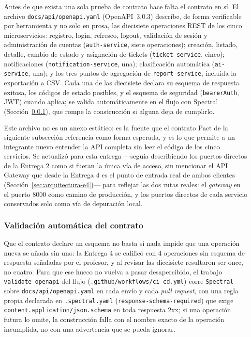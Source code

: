 Antes de que exista una sola prueba de contrato hace falta el contrato en sí. El archivo
\texttt{docs/api/openapi.yaml} (OpenAPI~3.0.3) describe, de forma verificable por herramienta y no
solo en prosa, las diecisiete operaciones REST de los cinco microservicios: registro, login,
refresco, logout, validación de sesión y administración de cuentas (\texttt{auth-service}, siete
operaciones); creación, listado, detalle, cambio de estado y asignación de tickets
(\texttt{ticket-service}, cinco); notificaciones (\texttt{notification-service}, una);
clasificación automática (\texttt{ai-service}, una); y los tres puntos de agregación de
\texttt{report-service}, incluida la exportación a CSV. Cada una de las diecisiete declara su
esquema de respuesta exitosa, los códigos de estado posibles, y el esquema de seguridad
(\texttt{bearerAuth}, JWT) cuando aplica; se valida automáticamente en el flujo con Spectral
(Sección~\ref{sec:validacion-contrato}), que rompe la construcción si alguna deja de cumplirlo.

Este archivo no es un anexo estático: es la fuente que el contrato Pact de la siguiente
subsección referencia como forma esperada, y es lo que permite a un integrante nuevo entender la
API completa sin leer el código de los cinco servicios. Se actualizó para esta entrega —seguía
describiendo los puertos directos de la Entrega 2 como si fueran la única vía de acceso, sin
mencionar el API Gateway que desde la Entrega 4 es el punto de entrada real de ambos clientes
(Sección~\ref{sec:arquitectura-e4})— para reflejar las dos rutas reales: el \emph{gateway} en el
puerto 8000 como camino de producción, y los puertos directos de cada servicio conservados solo
como vía de depuración local.

\subsubsection{Validación automática del contrato}
\label{sec:validacion-contrato}

Que el contrato declare un esquema no basta si nada impide que una operación nueva se añada sin
uno: la Entrega 4 se calificó con 4 operaciones sin esquema de respuesta señaladas por el
profesor, y al revisar las diecisiete resultaron ser once, no cuatro. Para que ese hueco no
vuelva a pasar desapercibido, el trabajo \texttt{validate-openapi} del flujo
(\texttt{.github/workflows/ci-cd.yml}) corre \texttt{Spectral} sobre
\texttt{docs/api/openapi.yaml} en cada envío y cada \emph{pull request}, con una regla propia
declarada en \texttt{.spectral.yaml} (\texttt{response-schema-required}) que exige
\texttt{content.application/json.schema} en toda respuesta 2xx; si una operación futura lo omite,
la construcción falla con el nombre exacto de la operación incumplida, no con una advertencia que
se pueda ignorar.


